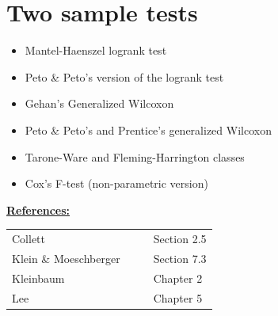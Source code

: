 \documentclass[11pt,slidesonly,semrot,portrait,palatino]{book}
\begin{document}
\section{Two sample tests}
\begin{itemize}
\item Mantel-Haenszel logrank test
\item Peto \& Peto's version of the logrank test
\item Gehan's Generalized Wilcoxon
\item Peto \& Peto's and Prentice's generalized Wilcoxon
\item Tarone-Ware and Fleming-Harrington classes
\item Cox's F-test (non-parametric version)
\end{itemize}
\underline{\bf References:}
\\
\begin{tabular}{ll}
Collett & Section 2.5\\
Klein \& Moeschberger~~~~ & Section 7.3\\
Kleinbaum &  Chapter 2\\
Lee & Chapter 5\\
\end{tabular}
\end{document}
